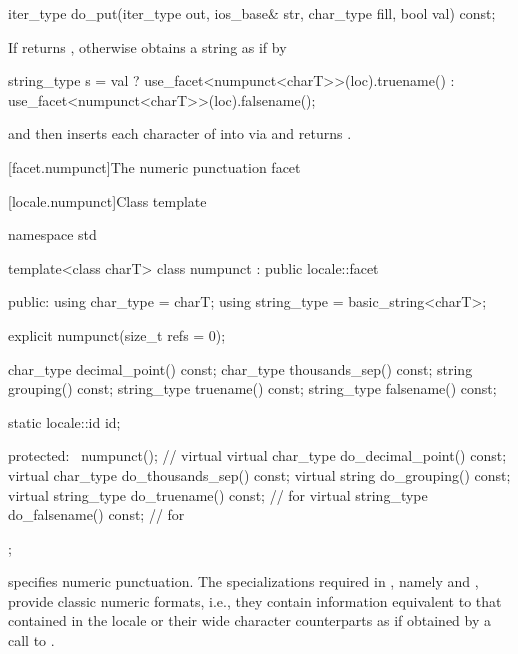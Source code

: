 %
\begin{itemdecl}
iter_type do_put(iter_type out, ios_base& str, char_type fill, bool val) const;
\end{itemdecl}

\begin{itemdescr}
\pnum
\returns
If
returns
,
otherwise obtains a string
as if by
\begin{codeblock}
string_type s =
  val ? use_facet<numpunct<charT>>(loc).truename()
      : use_facet<numpunct<charT>>(loc).falsename();
\end{codeblock}
and then inserts each character
of
into
via
and returns
.
\end{itemdescr}

[facet.numpunct]{The numeric punctuation facet}

[locale.numpunct]{Class template }

%
\begin{codeblock}
namespace std {
  template<class charT>
    class numpunct : public locale::facet {
    public:
      using char_type   = charT;
      using string_type = basic_string<charT>;

      explicit numpunct(size_t refs = 0);

      char_type    decimal_point()   const;
      char_type    thousands_sep()   const;
      string       grouping()        const;
      string_type  truename()        const;
      string_type  falsename()       const;

      static locale::id id;

    protected:
      ~numpunct();                                              // virtual
      virtual char_type    do_decimal_point() const;
      virtual char_type    do_thousands_sep() const;
      virtual string       do_grouping()      const;
      virtual string_type  do_truename()      const;            // for 
      virtual string_type  do_falsename()     const;            // for 
    };
}
\end{codeblock}

\pnum
{}
specifies numeric punctuation.
The specializations required in , namely
and
,
provide classic
numeric formats,
i.e., they contain information equivalent to that contained in the
locale or their wide character counterparts as if obtained by
a call to
.

